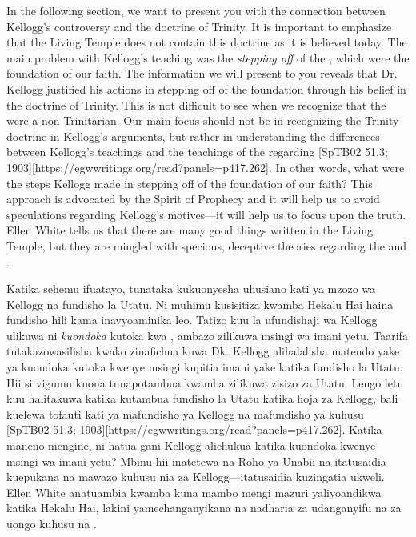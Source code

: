 In the following section, we want to present you with the connection between Kellogg’s controversy and the doctrine of Trinity. It is important to emphasize that the Living Temple does not contain this doctrine as it is believed today. The main problem with Kellogg’s teaching was the \textit{stepping off} of the , which were the foundation of our faith. The information we will present to you reveals that Dr. Kellogg justified his actions in stepping off of the foundation through his belief in the doctrine of Trinity. This is not difficult to see when we recognize that the  were a non-Trinitarian. Our main focus should not be in recognizing the Trinity doctrine in Kellogg's arguments, but rather in understanding the differences between Kellogg’s teachings and the teachings of the  regarding [SpTB02 51.3; 1903][https://egwwritings.org/read?panels=p417.262]. In other words, what were the steps Kellogg made in stepping off of the foundation of our faith? This approach is advocated by the Spirit of Prophecy and it will help us to avoid speculations regarding Kellogg’s motives—it will help us to focus upon the truth. Ellen White tells us that there are many good things written in the Living Temple, but they are mingled with specious, deceptive theories regarding the  and .


Katika sehemu ifuatayo, tunataka kukuonyesha uhusiano kati ya mzozo wa Kellogg na fundisho la Utatu. Ni muhimu kusisitiza kwamba Hekalu Hai haina fundisho hili kama inavyoaminika leo. Tatizo kuu la ufundishaji wa Kellogg ulikuwa ni \textit{kuondoka} kutoka kwa , ambazo zilikuwa msingi wa imani yetu. Taarifa tutakazowasilisha kwako zinafichua kuwa Dk. Kellogg alihalalisha matendo yake ya kuondoka kutoka kwenye msingi kupitia imani yake katika fundisho la Utatu. Hii si vigumu kuona tunapotambua kwamba  zilikuwa zisizo za Utatu. Lengo letu kuu halitakuwa katika kutambua fundisho la Utatu katika hoja za Kellogg, bali kuelewa tofauti kati ya mafundisho ya Kellogg na mafundisho ya  kuhusu [SpTB02 51.3; 1903][https://egwwritings.org/read?panels=p417.262]. Katika maneno mengine, ni hatua gani Kellogg alichukua katika kuondoka kwenye msingi wa imani yetu? Mbinu hii inatetewa na Roho ya Unabii na itatusaidia kuepukana na mawazo kuhusu nia za Kellogg—itatusaidia kuzingatia ukweli. Ellen White anatuambia kwamba kuna mambo mengi mazuri yaliyoandikwa katika Hekalu Hai, lakini yamechanganyikana na nadharia za udanganyifu na za uongo kuhusu  na .


